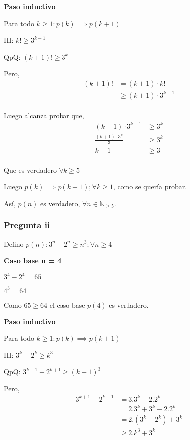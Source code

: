\textbf{Paso inductivo}

Para todo $k \geq 1: p(k) \implies p(k+1)$

HI: $k! \geq 3^{k-1}$

QpQ: $ (k+1)! \geq 3^{k}$

Pero,
\begin{align*}
    (k+1)! &= (k+1) \cdot k! \\
    &\geq (k+1) \cdot 3^{k-1} \\
\end{align*}

Luego alcanza probar que,
\begin{align*}
    (k+1) \cdot 3^{k-1} &\geq 3^{k} \\
    \frac{(k+1)\cdot 3^k}{3} &\geq 3^{k} \\
    k+1 &\geq 3 \\
\end{align*}

Que es verdadero $\forall k \geq 5$

Luego $p(k) \implies p(k+1); \forall k \geq 1$, como se quería probar.

Así, $p(n)$ es verdadero, $\forall n \in \mathbb{N}_{\geq 5}$.

\subsubsection{Pregunta ii}

Defino $ p(n): 3^n - 2^n \geq n^3; \forall n \geq 4 $

\textbf{Caso base n = 4}

$3^4 - 2^4 = 65$

$ 4^3 = 64$

Como $ 65 \geq 64 $ el caso base $p(4)$ es verdadero.

\textbf{Paso inductivo}

Para todo $k \geq 1: p(k) \implies p(k+1)$

HI: $3^k - 2^k \geq k^3$

QpQ: $ 3^{k+1} - 2^{k+1} \geq (k+1)^3$

Pero,
\begin{align*}
    3^{k+1} - 2^{k+1} &= 3.3^k - 2.2^k \\
    &= 2.3^k + 3^k - 2.2^k \\
    &= 2.(3^k - 2^k) + 3^k \\
    &\geq 2.k^3 + 3^k \\
\end{align*}

